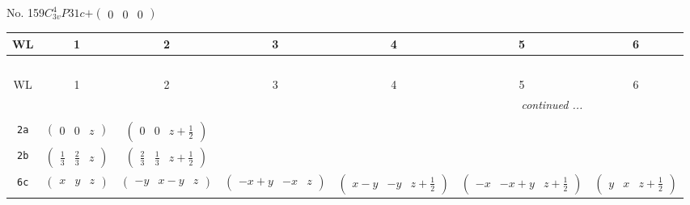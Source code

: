 \documentclass[fleqn,9pt,landscape]{jsarticle}
\begin{document}
\newpage
No. 159\quad$C_{3v}^{4}$\quad$P31c$\quad[ trigonal ]\quad$+\begin{pmatrix} 0 & 0 & 0 \end{pmatrix}$
\begin{center}
\renewcommand{\arraystretch}{1.2}
\begin{longtable}{ccccccc}
 \hline \hline
WL & 1 & 2 & 3 & 4 & 5 & 6 \\ \hline \endfirsthead

\multicolumn{6}{l}{\tablename\ \thetable{}} \\
 \hline \hline
WL & 1 & 2 & 3 & 4 & 5 & 6 \\ \hline \endhead

 \hline \hline
\multicolumn{6}{r}{\footnotesize\it continued ...} \\ \endfoot

 \hline \hline
\multicolumn{6}{r}{} \\ \endlastfoot

{\tt 2a} & $ \begin{pmatrix} 0 & 0 & z \end{pmatrix} $ & $ \begin{pmatrix} 0 & 0 & z + \frac{1}{2} \end{pmatrix} $ & $  $ & $  $ & $  $ & $  $ \\ \hline
{\tt 2b} & $ \begin{pmatrix} \frac{1}{3} & \frac{2}{3} & z \end{pmatrix} $ & $ \begin{pmatrix} \frac{2}{3} & \frac{1}{3} & z + \frac{1}{2} \end{pmatrix} $ & $  $ & $  $ & $  $ & $  $ \\ \hline
{\tt 6c} & $ \begin{pmatrix} x & y & z \end{pmatrix} $ & $ \begin{pmatrix} - y & x - y & z \end{pmatrix} $ & $ \begin{pmatrix} - x + y & - x & z \end{pmatrix} $ & $ \begin{pmatrix} x - y & - y & z + \frac{1}{2} \end{pmatrix} $ & $ \begin{pmatrix} - x & - x + y & z + \frac{1}{2} \end{pmatrix} $ & $ \begin{pmatrix} y & x & z + \frac{1}{2} \end{pmatrix} $ \\
\end{longtable}
\end{center}
\end{document}
